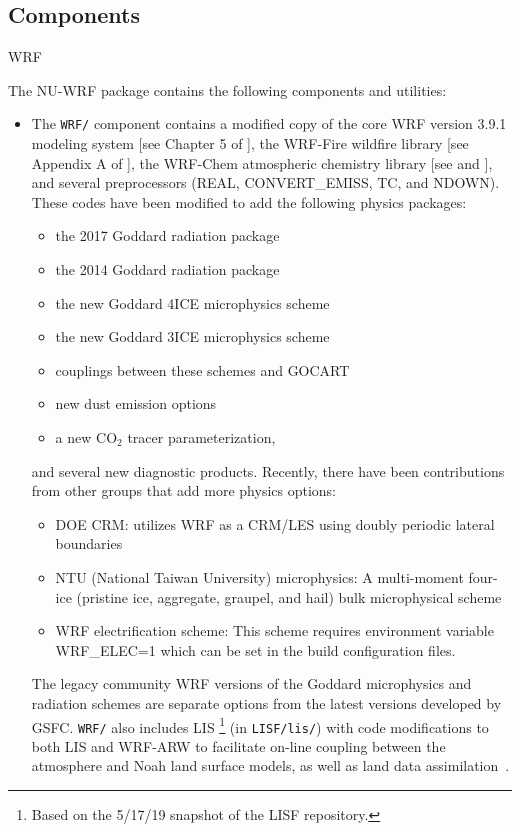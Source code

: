 \subsection{Components}
\label{subsec:Components}WRF

The NU-WRF package contains the following components and utilities:

\begin{itemize}
\item The \texttt{WRF/} component contains a modified copy of the core WRF 
  version 3.9.1 modeling system [see Chapter 5 of \cite{ref:ArwUserGuide}], 
  the WRF-Fire wildfire library [see Appendix A of \cite{ref:ArwUserGuide}], 
  the WRF-Chem atmospheric chemistry library [see \cite{ref:WrfChemUserGuide}
  and \cite{ref:WrfChemEmissionsGuide}], and several preprocessors (REAL, 
  CONVERT\_EMISS, TC, and NDOWN). These codes have been modified to add
  the following physics packages:
  \begin{itemize}
  \item the 2017 Goddard radiation package
  \item the 2014 Goddard radiation package~\citep{ref:GRADUserGuide}
  \item the new Goddard 4ICE microphysics scheme~\citep{ref:LangEtAl2014}
  \item the new Goddard 3ICE  microphysics scheme~\citep{ref:ShiEtAl2014}
  \item couplings between these schemes and GOCART
  \item new dust emission options
  \item a new CO$_2$ tracer parameterization,
  \end{itemize}
  and several new diagnostic products. Recently, there have been contributions
  from other groups that add more physics options:
  \begin{itemize}
  \item DOE CRM: utilizes WRF as a CRM/LES using doubly periodic lateral boundaries
  \item NTU (National Taiwan University) microphysics: A multi-moment four-ice (pristine ice, aggregate, graupel, and hail) bulk microphysical scheme
  \item WRF electrification scheme: This scheme requires environment variable WRF\_ELEC=1 which can be set in the build configuration files.
  \end{itemize}
  The legacy community WRF versions of  the Goddard microphysics and radiation 
  schemes are separate options from the
  latest versions developed by GSFC. \texttt{WRF/} also includes LIS \footnote{Based on the 5/17/19 snapshot of the LISF repository.}
  (in \texttt{LISF/lis/}) with code modifications to both LIS and WRF-ARW to 
  facilitate on-line coupling between the atmosphere and Noah land surface
  models, as well as land data assimilation~\citep{ref:LisUserGuide}.   


\end{itemize}
